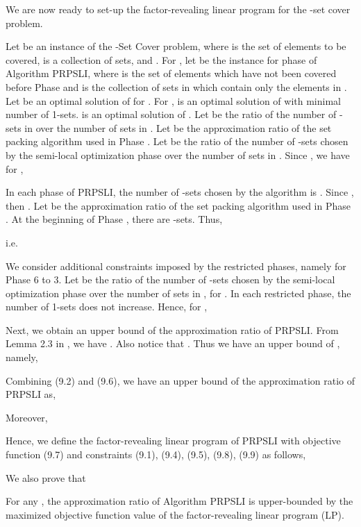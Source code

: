 \documentclass[runningheads,a4paper]{llncs}
\numberwithin{equation}{section}
\begin{document}
We are now ready to set-up the factor-revealing linear program for the -set cover problem.

Let  be an instance of the -Set Cover problem, where  is the set of elements to be covered,  is a collection of sets, and . For , let  be the instance for phase  of Algorithm PRPSLI, where  is the set of elements which have not been covered before Phase  and  is the collection of sets in  which contain only the elements in . Let  be an optimal solution of  for . For ,  is an optimal solution of  with minimal number of 1-sets.  is an optimal solution of . Let  be the ratio of the number of -sets in  over the number of sets in . Let  be the approximation ratio of the set packing algorithm used in Phase . Let  be the ratio of the number of -sets chosen by the semi-local optimization phase over the number of sets in . Since , we have for ,


In each phase of PRPSLI, the number of -sets chosen by the algorithm is . Since , then . Let  be the approximation ratio of the set packing algorithm used in Phase . At the beginning of Phase , there are  -sets. Thus,

i.e.


We consider additional constraints imposed by the restricted phases, namely for Phase 6 to 3. Let  be the ratio of the number of -sets chosen by the semi-local optimization phase over the number of sets in , for . In each restricted phase, the number of 1-sets does not increase. Hence, for ,


Next, we obtain an upper bound of the approximation ratio of PRPSLI. From Lemma 2.3 in \cite{furer}, we have . Also notice that . Thus we have an upper bound of , namely,


Combining (9.2) and (9.6), we have an upper bound of the approximation ratio of PRPSLI as,


Moreover,



Hence, we define the factor-revealing linear program of PRPSLI with objective function (9.7) and constraints (9.1), (9.4), (9.5), (9.8), (9.9) as follows,



We also prove that

\begin{lemma}
For any , the approximation ratio of Algorithm PRPSLI is upper-bounded by the maximized objective function value of the factor-revealing linear program (LP).
\end{lemma}
\end{document}
